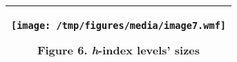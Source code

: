 \begin{longtable}[]{@{}c@{}}
\toprule
\begin{minipage}[t]{0.97\columnwidth}\centering\strut
\texttt{[image: /tmp/figures/media/image7.wmf]}

Figure 6. \emph{h}-index levels' sizes\strut
\end{minipage}\tabularnewline
\bottomrule

\end{longtable}